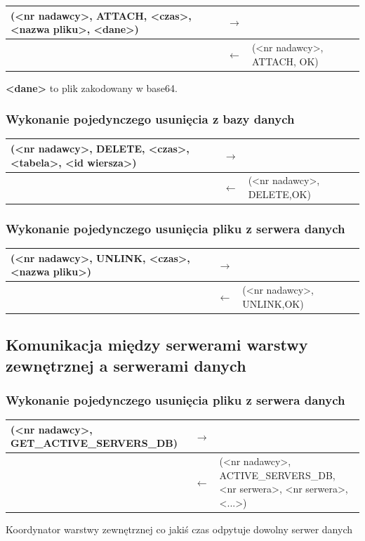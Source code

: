 \begin{longtable}{| p{} | p{}| p{} |} 
\hline
(<nr nadawcy>, ATTACH, <czas>, <nazwa pliku>, <dane>) & $\rightarrow$ &  \\ \hline
 & $\leftarrow$ & (<nr nadawcy>, ATTACH, OK) \\ \hline
\end{longtable}
\textbf{<dane>} to plik zakodowany w base64.

\subsubsection{Wykonanie pojedynczego usunięcia z bazy danych}

\begin{longtable}{| p{} | p{}| p{} |} 
\hline
(<nr nadawcy>, DELETE, <czas>, <tabela>, <id wiersza>) & $\rightarrow$ &  \\ \hline
 & $\leftarrow$ & (<nr nadawcy>, DELETE,OK) \\ \hline
\end{longtable}

\subsubsection{Wykonanie pojedynczego usunięcia pliku z serwera danych}

\begin{longtable}{| p{} | p{}| p{} |} 
\hline
(<nr nadawcy>, UNLINK, <czas>, <nazwa pliku>) & $\rightarrow$ &  \\ \hline
 & $\leftarrow$ & (<nr nadawcy>, UNLINK,OK) \\ \hline
\end{longtable}

\subsection{Komunikacja między serwerami warstwy zewnętrznej a serwerami danych}

\subsubsection{Wykonanie pojedynczego usunięcia pliku z serwera danych}

\begin{longtable}{| p{} | p{}| p{} |} 
\hline
(<nr nadawcy>, GET\_ACTIVE\_SERVERS\_DB) & $\rightarrow$ &  \\ \hline
 & $\leftarrow$ & (<nr nadawcy>, ACTIVE\_SERVERS\_DB, <nr serwera>, <nr serwera>, <...>) \\ \hline
\end{longtable}
Koordynator warstwy zewnętrznej co jakiś czas odpytuje dowolny serwer danych

